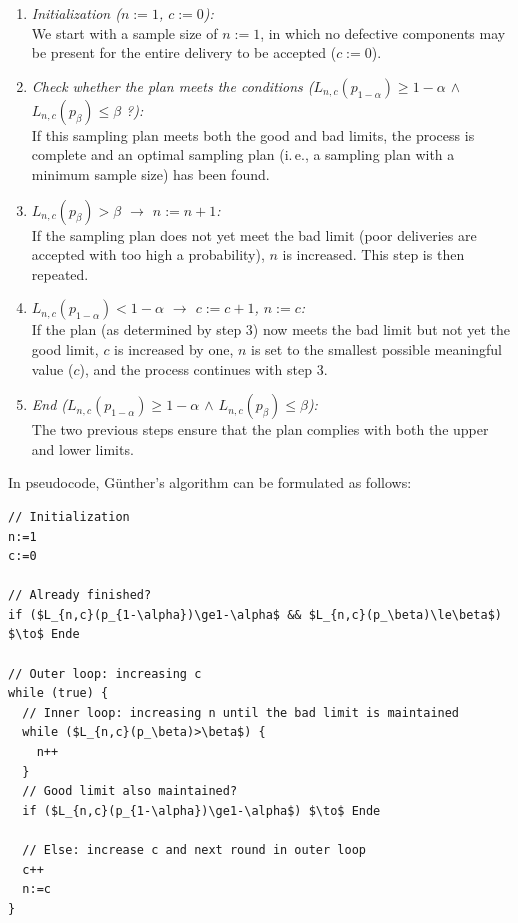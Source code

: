 \documentclass[a4paper,11pt,oneside]{article}
\begin{document}
\begin{enumerate}
\item
\emph{Initialization ($n:=1$, $c:=0$):}~\\
We start with a sample size of $n:=1$, in which no defective components may be present for the entire delivery to be accepted ($c:=0$).
\item
\emph{Check whether the plan meets the conditions ({\color{ForestGreen}$L_{n,c}(p_{1-\alpha})\ge1-\alpha$} $\wedge$ {\color{ForestGreen}$L_{n,c}(p_\beta)\le\beta$} ?):}~\\
If this sampling plan meets both the good and bad limits, the process is complete and an optimal sampling plan (i.\,e., a sampling plan with a minimum sample size) has been found.
\item
\emph{{\color{Red}$L_{n,c}(p_\beta)>\beta$} $\to$ $n:=n+1$:}~\\
If the sampling plan does not yet meet the bad limit (poor deliveries are accepted with too high a probability), $n$ is increased. This step is then repeated.
\item
\emph{{\color{Red}$L_{n,c}(p_{1-\alpha})<1-\alpha$} $\to$ $c:=c+1$, $n:=c$:}~\\
If the plan (as determined by step 3) now meets the bad limit but not yet the good limit, $c$ is increased by one, $n$ is set to the smallest possible meaningful value ($c$), and the process continues with step 3.
\item
\emph{End ({\color{ForestGreen}$L_{n,c}(p_{1-\alpha})\ge1-\alpha$} $\wedge$ {\color{ForestGreen}$L_{n,c}(p_\beta)\le\beta$}):}~\\
The two previous steps ensure that the plan complies with both the upper and lower limits.
\end{enumerate}

In pseudocode, Günther's algorithm can be formulated as follows:

\begin{lstlisting}[inputencoding={utf8},frame=single]
// Initialization
n:=1
c:=0

// Already finished?
if ($L_{n,c}(p_{1-\alpha})\ge1-\alpha$ && $L_{n,c}(p_\beta)\le\beta$) $\to$ Ende

// Outer loop: increasing c
while (true) {
  // Inner loop: increasing n until the bad limit is maintained
  while ($L_{n,c}(p_\beta)>\beta$) {
    n++
  }
  // Good limit also maintained?
  if ($L_{n,c}(p_{1-\alpha})\ge1-\alpha$) $\to$ Ende

  // Else: increase c and next round in outer loop
  c++
  n:=c
}
\end{lstlisting}
\end{document}
